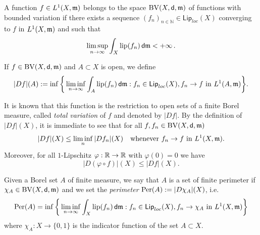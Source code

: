 \documentclass[12pt,a4paper]{article}
\begin{document}
\medskip


A function $f\in L^1(X,\mathfrak m)$ belongs to the %
space ${\rm BV}(X,\mathsf{d},\mathfrak m)$ of functions with bounded variation if there exists a sequence $(f_n)_{n\in\mathbb{N}}\in \mathsf{Lip}_{loc}(X)$ converging to $f$ in $L^1(X,\mathfrak m)$ and such that
$$\limsup_{n\to \infty}\int_X \mathrm{lip}(f_n)\, \mathsf{d}\mathfrak m <+\infty\, .$$

If $f\in {\rm BV}(X,\mathsf{d},\mathfrak m)$ and $A\subset X$ is open, we define 
\begin{equation*}\label{eq:defTV}
|Df|(A):=\inf\bigg\{\liminf_{n\rightarrow \infty}\int_A \mathrm{lip}(f_n)\,\mathsf{d}\mathfrak m: f_n\in \mathsf{Lip}_{loc}(X), f_n\rightarrow f \ \mathrm{in} \ L^1(A,\mathfrak m)\bigg\}.
\end{equation*}

It is known that this function is the restriction to open sets of a finite Borel measure, called \textit{total variation} of $f$ and denoted by $|Df|$. By the  definition of $|Df|(X)$, it is immediate to see that for all $f, f_n\in {\rm BV}(X,\mathsf{d},\mathfrak m)$
\begin{equation*}\label{eq:lscbv}
|Df|(X)\leq \liminf_n |Df_n|(X) \quad \textrm{whenever} \ f_n\rightarrow f \ \textrm{in} \ L^1(X,\mathfrak m).
\end{equation*}
Moreover, for all $1$-Lipschitz $\varphi:\mathbb{R}\to \mathbb{R}$  with $\varphi(0)=0$ we have 
$$|D(\varphi\circ f)|(X)\leq |Df|(X).$$

Given a Borel set $A$ of finite measure, we say that $A$ is a set of finite perimeter if $\chi_A\in {\rm BV}(X,\mathsf{d},\mathfrak m)$ and we set the \textit{perimeter}  $\mathrm{Per}(A):=|D\chi_A|(X)$, i.e.
\begin{equation*}\label{def:per}
\mathrm{Per}(A)=\inf\bigg\{\liminf_{n\rightarrow \infty}\int_X \mathrm{lip}(f_n)\,\mathsf{d}\mathfrak m: f_n\in \mathsf{Lip}_{loc}(X), f_n\rightarrow \chi_A \ \mathrm{in} \ L^1(X,\mathfrak m)\bigg\}
\end{equation*}
where $\chi_A:X\to\{0,1\}$ is the indicator function of the set $A\subset X$.
\end{document}
